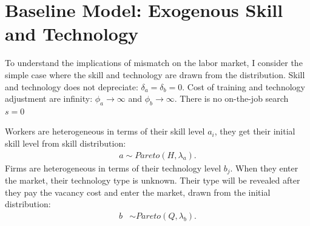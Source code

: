\documentclass[12pt]{article}
\newcommand{\1}{\mathbb{1}}
\begin{document}
\section{Baseline Model: Exogenous Skill and Technology}
To understand the implications of mismatch on the labor market, I consider the simple case where the skill and technology are drawn from the distribution. Skill and technology does not depreciate: $\delta_a = \delta_b = 0$. Cost of training and technology adjustment are infinity: $\phi_a \to \infty$ and $\phi_b \to \infty$. There is no on-the-job search $s=0$ 

Workers are heterogeneous in terms of their skill level $a_i$, they get their initial skill level from skill distribution: 
\begin{align*}
a \sim Pareto(H,\lambda_a).
\end{align*}
Firms are heterogeneous in terms of their technology level $b_j$. When they enter the market, their technology type is unknown. Their type will be revealed after they pay the vacancy cost and enter the market, drawn from the initial distribution: 
\begin{align*}
b &\sim Pareto(Q,\lambda_b).
\end{align*}
\end{document}
